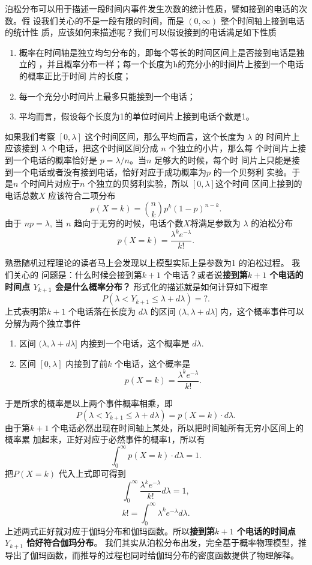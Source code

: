 {泊松分布可以用于描述一段时间内事件发生次数的统计性质，譬如接到的电话的次数。假
设我们关心的不是一段有限的时间，而是 $(0, \infty)$ 整个时间轴上接到电话的统计性
质，应该如何来描述呢？我们可以假设接到的电话满足如下性质
\begin{enumerate}
\item 概率在时间轴是独立均匀分布的，即每个等长的时间区间上是否接到电话是独立的
，并且概率分布一样；每一个长度为h的充分小的时间片上接到一个电话的概率正比于时间
片的长度；
\item 每一个充分小时间片上最多只能接到一个电话；
\item 平均而言，假设每个长度为1的单位时间片上接到电话个数是1。
\end{enumerate}
如果我们考察 $[0, \lambda]$ 这个时间区间，那么平均而言，这个长度为 $\lambda$ 的
时间片上应该接到 $\lambda$ 个电话，把这个时间区间分成 $n$ 个独立的小片，那么每
个时间片上接到一个电话的概率恰好是 $p = \lambda/n$。当$n$ 足够大的时候，每个时
间片上只能是接到一个电话或者没有接到电话，恰好对应于成功概率为$p$ 的一个贝努利
实验。于是$n$ 个时间片对应于$n$ 个独立的贝努利实验，所以 $[0, \lambda]$这个时间
区间上接到的电话总数$X$ 应该符合二项分布
$$p(X=k) = \binom{n}{k} p^k(1-p)^{n-k} .$$
由于 $np= \lambda$, 当 $n$ 趋向于无穷的时候，电话个数$X$将满足参数为
$\lambda$ 的泊松分布
$$p(X=k) = \frac{\lambda^k e^{-\lambda}}{k!} .$$

熟悉随机过程理论的读者马上会发现以上模型实际上是参数为1 的泊松过程。 我们关心的
问题是：什么时候会接到第${k+1}$ 个电话？或者说{\bf 接到第$k+1$ 个电话的时间点
$Y_{k+1}$ 会是什么概率分布？} 形式化的描述就是如何计算如下概率
$$ P(\lambda < Y_{k+1} \le \lambda +  d\lambda) = ? .$$
上式表明第$k+1$ 个电话落在长度为 $d\lambda$ 的区间 $(\lambda, \lambda +
d\lambda] $ 内，这个概率事件可以分解为两个独立事件
\begin{enumerate}
\item 区间 $(\lambda, \lambda +  d\lambda] $ 内接到一个电话，这个概率是 $d \lambda .$
\item 区间 $[0, \lambda]$ 内接到了前$k$ 个电话，这个概率是 
$$ p(X=k) = \frac{\lambda^k e^{-\lambda}}{k!} .$$
\end{enumerate}
于是所求的概率是以上两个事件概率相乘，即
$$ P(\lambda < Y_{k+1} \le \lambda +  d\lambda) = p(X=k) \cdot d \lambda .$$
由于第$k+1$ 个电话必然出现在时间轴上某处，所以把时间轴所有无穷小区间上的概率累
加起来，正好对应于必然事件的概率1，所以有
$$ \int_0^\infty  p(X=k) \cdot d \lambda  = 1 .$$
把$P(X=k)$ 代入上式即可得到 
$$ \int_0^\infty \frac{\lambda^k e^{-\lambda}}{k!}  d \lambda  = 1 ,$$
$$ k! = \int_0^\infty \lambda^k e^{-\lambda} d \lambda .$$
上述两式正好就对应于伽玛分布和伽玛函数。所以{\bf  接到第$k+1$ 个电话的时间点
$Y_{k+1}$ 恰好符合伽玛分布}。 我们其实从泊松分布出发，完全基于概率物理模型，推
导出了伽玛函数，而推导的过程也同时给伽玛分布的密度函数提供了物理解释。

}
